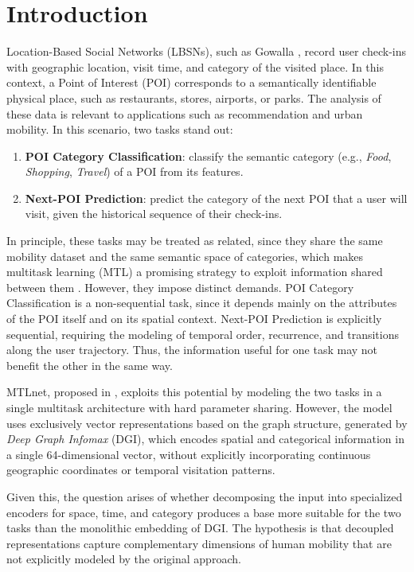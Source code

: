 \section{Introduction}
\label{sec:courb:intro}

Location-Based Social Networks (LBSNs), such as Gowalla \cite{cho2011gowalla,jure2014snap}, record user check-ins with geographic location, visit time, and category of the visited place. In this context, a Point of Interest (POI) corresponds to a semantically identifiable physical place, such as restaurants, stores, airports, or parks. The analysis of these data is relevant to applications such as recommendation and urban mobility. In this scenario, two tasks stand out:

\begin{enumerate}
    \item \textbf{POI Category Classification}: classify the semantic category (e.g., \textit{Food}, \textit{Shopping}, \textit{Travel}) of a POI from its features.
    \item \textbf{Next-POI Prediction}: predict the category of the next POI that a user will visit, given the historical sequence of their check-ins.
\end{enumerate}

In principle, these tasks may be treated as related, since they share the same mobility dataset and the same semantic space of categories, which makes multitask learning (MTL) a promising strategy to exploit information shared between them \cite{caruana1997multitask}. However, they impose distinct demands. POI Category Classification is a non-sequential task, since it depends mainly on the attributes of the POI itself and on its spatial context. Next-POI Prediction is explicitly sequential, requiring the modeling of temporal order, recurrence, and transitions along the user trajectory. Thus, the information useful for one task may not benefit the other in the same way.

MTLnet, proposed in \cite{silva2025mtlnet}, exploits this potential by modeling the two tasks in a single multitask architecture with hard parameter sharing. However, the model uses exclusively vector representations based on the graph structure, generated by \textit{Deep Graph Infomax} (DGI), which encodes spatial and categorical information in a single 64-dimensional vector, without explicitly incorporating continuous geographic coordinates or temporal visitation patterns.

Given this, the question arises of whether decomposing the input into specialized encoders for space, time, and category produces a base more suitable for the two tasks than the monolithic embedding of DGI. The hypothesis is that decoupled representations capture complementary dimensions of human mobility that are not explicitly modeled by the original approach.

